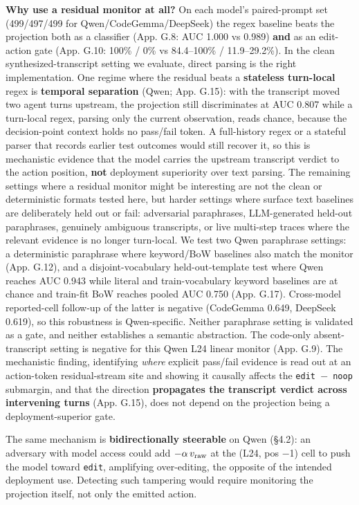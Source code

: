 \documentclass[
  11pt,
  a4paper]{article}
\begin{document}
\textbf{Why use a residual monitor at all?} On each model's
paired-prompt set (499/497/499 for Qwen/CodeGemma/DeepSeek) the regex
baseline beats the projection both as a classifier (App. G.8: AUC 1.000
vs 0.989) \textbf{and} as an edit-action gate (App. G.10: 100\% / 0\% vs
84.4--100\% / 11.9--29.2\%). In the clean synthesized-transcript setting
we evaluate, direct parsing is the right implementation. One regime
where the residual beats a \textbf{stateless turn-local} regex is
\textbf{temporal separation} (Qwen; App. G.15): with the transcript
moved two agent turns upstream, the projection still discriminates at
AUC 0.807 while a turn-local regex, parsing only the current
observation, reads chance, because the decision-point context holds no
pass/fail token. A full-history regex or a stateful parser that records
earlier test outcomes would still recover it, so this is mechanistic
evidence that the model carries the upstream transcript verdict to the
action position, \textbf{not} deployment superiority over text parsing.
The remaining settings where a residual monitor might be interesting are
not the clean or deterministic formats tested here, but harder settings
where surface text baselines are deliberately held out or fail:
adversarial paraphrases, LLM-generated held-out paraphrases, genuinely
ambiguous transcripts, or live multi-step traces where the relevant
evidence is no longer turn-local. We test two Qwen paraphrase settings:
a deterministic paraphrase where keyword/BoW baselines also match the
monitor (App. G.12), and a disjoint-vocabulary held-out-template test
where Qwen reaches AUC 0.943 while literal and train-vocabulary keyword
baselines are at chance and train-fit BoW reaches pooled AUC 0.750 (App.
G.17). Cross-model reported-cell follow-up of the latter is negative
(CodeGemma 0.649, DeepSeek 0.619), so this robustness is Qwen-specific.
Neither paraphrase setting is validated as a gate, and neither
establishes a semantic abstraction. The code-only absent-transcript
setting is negative for this Qwen L24 linear monitor (App. G.9). The
mechanistic finding, identifying \emph{where} explicit pass/fail
evidence is read out at an action-token residual-stream site and showing
it causally affects the \texttt{edit\ \ensuremath{-}\ noop} submargin, and that the
direction \textbf{propagates the transcript verdict across intervening
turns} (App. G.15), does not depend on the projection being a
deployment-superior gate.

The same mechanism is \textbf{bidirectionally steerable} on Qwen (\S{}4.2):
an adversary with model access could add \(-\alpha\,v_{\rm raw}\) at the
(L24, pos \ensuremath{-}1) cell to push the model toward \texttt{edit}, amplifying
over-editing, the opposite of the intended deployment use. Detecting
such tampering would require monitoring the projection itself, not only
the emitted action.
\end{document}
